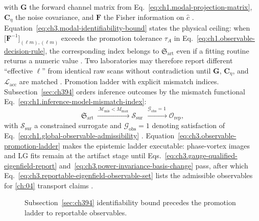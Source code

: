 with \(\mathbf{G}\) the forward channel matrix from Eq.~\eqref{eq:ch1.modal-projection-matrix}, \(\mathbf{C}_{\eta}\) the noise covariance, and
\(\mathbf{F}\) the Fisher information on \(\widehat{c}\) \cite{harrington2001}. Equation~\eqref{eq:ch3.modal-identifiability-bound}
states the physical ceiling: when \(\bigl[\mathbf{F}^{-1}\bigr]_{(\ell m),(\ell m)}\) exceeds the promotion tolerance
\(\tau_{A}\) in Eq.~\eqref{eq:ch1.observable-decision-rule}, the corresponding index belongs to \(\mathfrak{S}_{\mathrm{art}}\) even if a fitting
routine returns a numeric value \cite{harrington2001}. Two laboratories may therefore report different ``effective \(\ell\)'' from identical
raw scans without contradiction until \(\mathbf{G}\), \(\mathbf{C}_{\eta}\), and \(\mathcal{L}_{\mathrm{acc}}\) are matched \cite{devaney2004}.
Promotion ladder with explicit mismatch indices. Subsection~\ref{sec:ch394} orders inference outcomes by the mismatch functional
Eq.~\eqref{eq:ch1.inference-model-mismatch-index}:
\begin{equation}
\label{eq:ch3.observable-promotion-ladder}
\mathfrak{S}_{\mathrm{art}}
\ \xrightarrow{\ \mathcal{M}_{\mathrm{mis}}<M_{\max}\ }
\mathcal{S}_{\mathrm{sur}}
\ \xrightarrow{\ \mathcal{G}_{\mathrm{obs}}=1\ }
\mathcal{O}_{\mathrm{rep}},
\end{equation}
with \(\mathcal{S}_{\mathrm{sur}}\) a constrained surrogate and \(\mathcal{G}_{\mathrm{obs}}=1\) denoting satisfaction of Eq.~\eqref{eq:ch1.global-observable-admissibility}
\cite{harrington2001}. Equation~\eqref{eq:ch3.observable-promotion-ladder}
makes the epistemic ladder executable: phase-vortex images and LG fits remain at the artifact stage until
Eqs.~\eqref{eq:ch3.gauge-qualified-eigenfield-report} and~\eqref{eq:ch3.power-invariance-basis-change} pass, after which
Eq.~\eqref{eq:ch3.reportable-eigenfield-observable-set} lists the admissible observables for \ref{ch:04} transport claims
\cite{hansen1988}.
\begin{figure}[t]
\centering
{}
\caption{Subsection~\ref{sec:ch394} identifiability bound precedes the promotion ladder to reportable observables.}
\label{fig:ch3.394-identifiability-ladder}
\end{figure}
